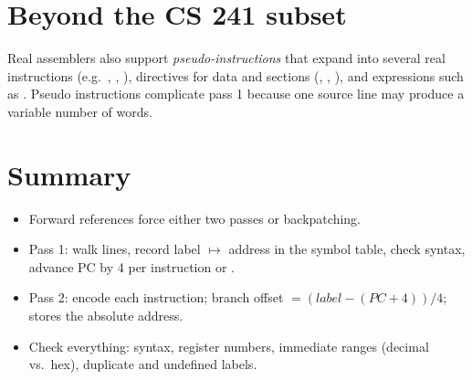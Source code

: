 \section{Beyond the CS 241 subset}

Real assemblers also support \emph{pseudo-instructions} that expand into several real
instructions (e.g.\ , , ), directives for data and sections
(, , ), and expressions such as . Pseudo
instructions complicate pass 1 because one source line may produce a variable number of
words.

\section{Summary}
\begin{itemize}
  \item Forward references force either two passes or backpatching.
  \item Pass 1: walk lines, record label $\mapsto$ address in the symbol table, check syntax,
        advance PC by 4 per instruction or .
  \item Pass 2: encode each instruction; branch offset $= (\mathit{label} - (\mathit{PC}+4))/4$;
         stores the absolute address.
  \item Check everything: syntax, register numbers, immediate ranges (decimal vs.\ hex),
        duplicate and undefined labels.
\end{itemize}
